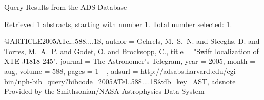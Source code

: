 Query Results from the ADS Database


Retrieved 1 abstracts, starting with number 1.  Total number selected: 1.

@ARTICLE{2005ATel..588....1S,
   author = {{Gehrels}, M.~S.~N. and {Steeghs}, D. and {Torres}, M.~A.~P. and 
	{Godet}, O. and {Brocksopp}, C.},
    title = "{Swift localization of XTE J1818-245}",
  journal = {The Astronomer's Telegram},
     year = 2005,
    month = aug,
   volume = 588,
    pages = {1-+},
   adsurl = {http://adsabs.harvard.edu/cgi-bin/nph-bib_query?bibcode=2005ATel..588....1S&db_key=AST},
  adsnote = {Provided by the Smithsonian/NASA Astrophysics Data System}
}


